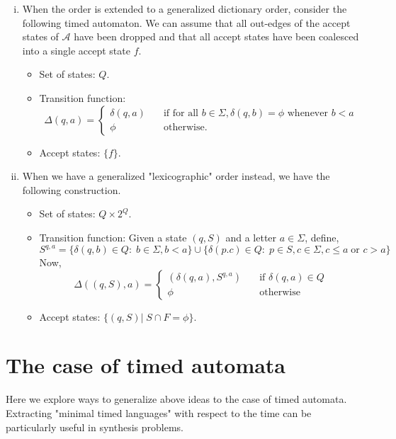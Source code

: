 \documentclass[a4paper,12pt]{article}
\theoremstyle{break}
\begin{document}
\begin{enumerate}[(i)]
    \item When the order is extended to a generalized dictionary order, consider the following timed automaton. We can assume that all out-edges of the accept states of $\mathcal{A}$ have been dropped and that all accept states have been coalesced into a single accept state $f$. 
        {\begin{itemize}
            \item Set of states: $Q$.
            \item Transition function: 
                \[
                    \Delta(q,a)=
                    \begin{cases}
                        \delta(q,a) &\quad \text{if for all }b\in\Sigma,\delta(q,b)=\phi \text{ whenever }b<a\\
                        \phi &\quad \text{otherwise}. 
                    \end{cases}    
                \]
            \item Accept states: $\{f\}$.
        \end{itemize}}
    \item When we have a generalized "lexicographic" order instead, we have the following construction.
    {\begin{itemize}
        \item Set of states: $Q\times 2^Q$.
        \item Transition function: Given a state $(q,S)$ and a letter $a\in\Sigma$, define, $$S^{q,a}=\{\delta(q,b)\in Q:\; b\in\Sigma, b<a\}\cup\{\delta(p.c)\in Q:\; p\in S,c\in\Sigma,c\leq a\;\text{or }c>a\}$$
        Now, \[
                \Delta((q,S),a)=
                \begin{cases}
                    (\delta(q,a),S^{q,a}) &\quad \text{if } \delta(q,a)\in Q\\
                    \phi &\quad \text{otherwise} 
                \end{cases}    
            \]
        \item Accept states: $\{(q,S)|\; S\cap F=\phi\}$.
    \end{itemize}}
\end{enumerate} 

\section{The case of timed automata}

Here we explore ways to generalize above ideas to the case of timed automata. Extracting "minimal timed languages" with respect to the time can be particularly useful in synthesis problems.\\
\end{document}
